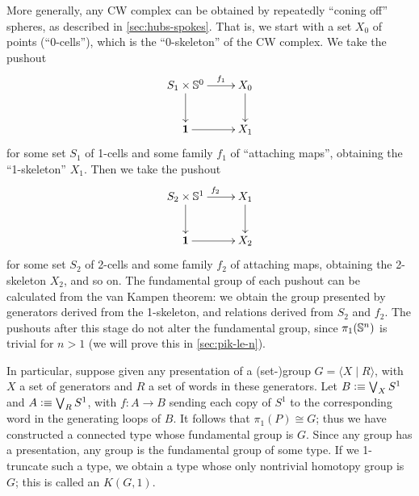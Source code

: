 \begin{eg}
  More generally, any CW complex can be obtained by repeatedly ``coning off'' spheres, as described in \autoref{sec:hubs-spokes}.
  That is, we start with a set $X_0$ of points (``0-cells''), which is the ``0-skeleton'' of the CW complex.
  We take the pushout
  \begin{equation*}
    \vcenter{\xymatrix{
        S_1 \times \Sn^0\ar[r]^-{f_1}\ar[d] &
        X_0\ar[d]\\
        \unit \ar[r] &
        X_1
      }}
  \end{equation*}
  for some set $S_1$ of 1-cells and some family $f_1$ of ``attaching maps'', obtaining the ``1-skeleton'' $X_1$.
  Then we take the pushout
  \begin{equation*}
    \vcenter{\xymatrix{
        S_2 \times \Sn^1\ar[r]^{f_2}\ar[d] &
        X_1\ar[d]\\
        \unit \ar[r] &
        X_2
      }}
  \end{equation*}
  for some set $S_2$ of 2-cells and some family $f_2$ of attaching maps, obtaining the 2-skeleton $X_2$, and so on.
  The fundamental group of each pushout can be calculated from the van Kampen theorem: we obtain the group presented by generators derived from the 1-skeleton, and relations derived from $S_2$ and $f_2$.
  The pushouts after this stage do not alter the fundamental group, since $\pi_1(\mathbb{S}^n)$ is trivial for $n>1$ (we will prove this in \autoref{sec:pik-le-n}).
\end{eg}

\begin{eg}\label{eg:kg1}
  In particular, suppose given any presentation of a (set-)group $G = \langle X \mid R \rangle$, with $X$ a set of generators and $R$ a set of words in these generators.
  Let $B\vcentcolon\equiv \bigvee_X S^1$ and $A\vcentcolon\equiv \bigvee_R S^1$, with $f:A\to B$ sending each copy of $S^1$ to the corresponding word in the generating loops of $B$.
  It follows that $\pi_1(P) \cong G$; thus we have constructed a connected type whose fundamental group is $G$.
  Since any group has a presentation, any group is the fundamental group of some type.
  If we 1-truncate such a type, we obtain a type whose only nontrivial homotopy group is $G$; this is called an  $K(G,1)$.%
\end{eg}

